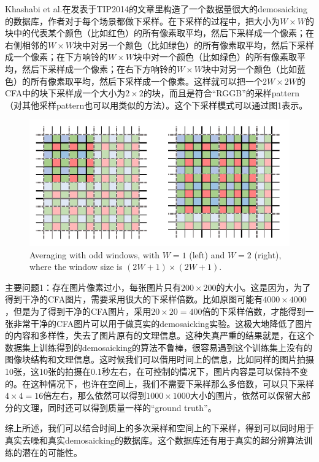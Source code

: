 \documentclass[10pt,twocolumn,letterpaper]{article}
\begin{document}
Khashabi et al.在发表于TIP2014的文章\cite{khashabi2014joint}里构造了一个数据量很大的demosaicking的数据库，作者对于每个场景都做下采样。在下采样的过程中，把大小为$W\times W$的块中的代表某个颜色（比如红色）的所有像素取平均，然后下采样成一个像素；在右侧相邻的$W\times W$块中对另一个颜色（比如绿色）的所有像素取平均，然后下采样成一个像素；在下方响铃的$W\times W$块中对一个颜色（比如绿色）的所有像素取平均，然后下采样成一个像素；在右下方响铃的$W\times W$块中对另一个颜色（比如蓝色）的所有像素取平均，然后下采样成一个像素。这样就可以把一个$2W\times2W$的CFA中的块下采样成一个大小为$2\times2$的块，而且是符合``RGGB''的采样pattern（对其他采样pattern也可以用类似的方法）。这个下采样模式可以通过图1表示。

\begin{figure}
\centering
\includegraphics[width=0.95\linewidth]{CFA.png}
\caption{Averaging with odd windows, with $W = 1$ (left) and $W = 2$ (right),
where the window size is $(2W + 1)\times (2W + 1)$.
}
\label{fig1}
\end{figure}


主要问题1：存在图片像素过小，每张图片只有$200\times200$的大小。这是因为，为了得到干净的CFA图片，需要采用很大的下采样倍数。比如原图可能有$4000\times4000$，但是为了得到干净的CFA图片，采用$20\times20=400$倍的下采样倍数，才能得到一张非常干净的CFA图片可以用于做真实的demosaicking实验。这极大地降低了图片的内容和多样性，失去了图片原有的文理信息。这种失真严重的结果就是，在这个数据集上训练得到的demosaicking的算法不鲁棒，很容易遇到这个训练集上没有的图像块结构和文理信息。这时候我们可以借用时间上的信息，比如同样的图片拍摄10张，这10张的拍摄在0.1秒左右，在可控制的情况下，图片内容是可以保持不变的。在这种情况下，也许在空间上，我们不需要下采样那么多倍数，可以只下采样$4\times4=16$倍左右，那么依然可以得到$1000\times1000$大小的图片，依然可以保留大部分的文理，同时还可以得到质量一样的``ground truth''。

综上所述，我们可以结合时间上的多次采样和空间上的下采样，得到可以同时用于真实去噪和真实demosaicking的数据库。这个数据库还有用于真实的超分辨算法训练的潜在的可能性。



{
\small


}
\end{document}
